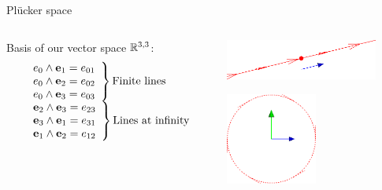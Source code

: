 \documentclass{beamer}
\begin{document}
\begin{frame}{Pl\"ucker space}
  \begin{columns}
    \begin{column}{5cm}
      Basis of our vector space $\mathbb{R}^{3,3}$: 
      \begin{equation*}
        \begin{array}{l}
          \left. \begin{array}{l}
            e_0\wedge\mathbf{e}_1 = e_{01} \\
            e_0\wedge\mathbf{e}_2 = e_{02} \\
            e_0\wedge\mathbf{e}_3 = e_{03}
          \end{array} \right\} \mbox{Finite lines}
          \\
          \left. \begin{array}{l}
            \mathbf{e}_2\wedge\mathbf{e}_3 = e_{23} \\
            \mathbf{e}_3\wedge\mathbf{e}_1 = e_{31} \\
            \mathbf{e}_1\wedge\mathbf{e}_2 = e_{12}
          \end{array} \right\} \mbox{Lines at infinity}
        \end{array}
      \end{equation*}
    \end{column}
    \begin{column}{5cm}
      \begin{center}
        \includegraphics[width=5cm]{line}

        \includegraphics[width=3cm]{idealline}
      \end{center}
    \end{column}
  \end{columns}
\end{frame}
\end{document}
